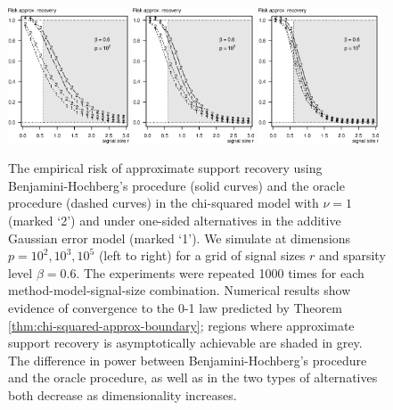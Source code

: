 \begin{figure}
      \centering
      \includegraphics[width=0.32\textwidth]{./sim_one-vs-two-sided/approx_recovery_one-vs-two-sided_beta06_p100.eps}
      \includegraphics[width=0.32\textwidth]{./sim_one-vs-two-sided/approx_recovery_one-vs-two-sided_beta06_p1000.eps}
      \includegraphics[width=0.32\textwidth]{./sim_one-vs-two-sided/approx_recovery_one-vs-two-sided_beta06_p100000.eps}
      \caption{The empirical risk of approximate support recovery using Benjamini-Hochberg's procedure (solid curves) and the oracle procedure (dashed curves) in the chi-squared model with $\nu=1$ (marked `2') and under one-sided alternatives in the additive Gaussian error model (marked `1'). 
      We simulate at dimensions $p=10^2, 10^3, 10^5$ (left to right) for a grid of signal sizes $r$ and sparsity level $\beta=0.6$.
      The experiments were repeated 1000 times for each method-model-signal-size combination. 
      Numerical results show evidence of convergence to the 0-1 law predicted by Theorem \ref{thm:chi-squared-approx-boundary}; regions where approximate support recovery is asymptotically achievable are shaded in grey.
      The difference in power between Benjamini-Hochberg's procedure and the oracle procedure, as well as in the two types of alternatives both decrease as dimensionality increases.} 
      \label{fig:one-vs-two-sided-approx_support_recovery}
\end{figure}


